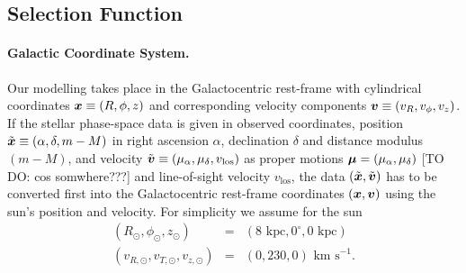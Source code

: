 



\subsection{Selection Function} \label{sec:selectionfunction}

\paragraph{Galactic Coordinate System.} Our modelling takes place in the Galactocentric rest-frame with cylindrical coordinates $\boldsymbol{x} \equiv (R,\phi,z)$ and corresponding velocity components $\boldsymbol{v} \equiv (v_R,v_\phi,v_z)$. If the stellar phase-space data is given in observed coordinates, position $\tilde{\boldsymbol{x}} \equiv(\alpha,\delta,m-M)$ in right ascension $\alpha$, declination $\delta$ and distance modulus $(m-M)$, and velocity $\tilde{\boldsymbol{v}} \equiv (\mu_\alpha,\mu_\delta,v_\text{los})$ as proper motions $\boldsymbol{\mu}=(\mu_\alpha,\mu_\delta)$ [TO DO: cos somwhere???] and line-of-sight velocity $v_\text{los}$, the data $(\tilde{\boldsymbol{x}},\tilde{\boldsymbol{v}})$ has to be converted first into the Galactocentric rest-frame coordinates $(\boldsymbol{x},\boldsymbol{v})$ using the sun's position and velocity. For simplicity we assume for the sun
\begin{eqnarray*}
(R_\odot,\phi_\odot,z_\odot) &=&(8 \text{ kpc}, 0^\circ, 0 \text{ kpc})\\
(v_{R,\odot},v_{T,\odot},v_{z,\odot}) &=& (0,230,0) \text{ km s}^{-1}.
\end{eqnarray*}

